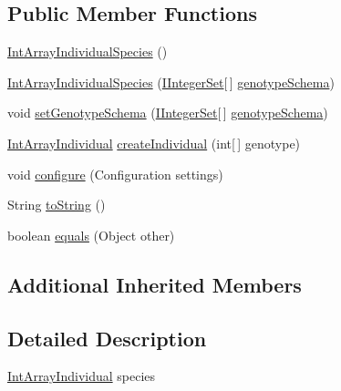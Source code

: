 \subsection*{Public Member Functions}
\begin{DoxyCompactItemize}
\item 
\hyperlink{classnet_1_1sf_1_1jclec_1_1intarray_1_1_int_array_individual_species_a1d4a3c33bf3f78b558bb1738b250b91a}{Int\-Array\-Individual\-Species} ()
\item 
\hyperlink{classnet_1_1sf_1_1jclec_1_1intarray_1_1_int_array_individual_species_a54f9d2290f50026820b68188daebc446}{Int\-Array\-Individual\-Species} (\hyperlink{interfacenet_1_1sf_1_1jclec_1_1util_1_1intset_1_1_i_integer_set}{I\-Integer\-Set}\mbox{[}$\,$\mbox{]} \hyperlink{classnet_1_1sf_1_1jclec_1_1intarray_1_1_int_array_species_a715c2117e4b1c70ab004accbf15848b7}{genotype\-Schema})
\item 
void \hyperlink{classnet_1_1sf_1_1jclec_1_1intarray_1_1_int_array_individual_species_a4bdfe95a34445e5a58c4296db3a1960b}{set\-Genotype\-Schema} (\hyperlink{interfacenet_1_1sf_1_1jclec_1_1util_1_1intset_1_1_i_integer_set}{I\-Integer\-Set}\mbox{[}$\,$\mbox{]} \hyperlink{classnet_1_1sf_1_1jclec_1_1intarray_1_1_int_array_species_a715c2117e4b1c70ab004accbf15848b7}{genotype\-Schema})
\item 
\hyperlink{classnet_1_1sf_1_1jclec_1_1intarray_1_1_int_array_individual}{Int\-Array\-Individual} \hyperlink{classnet_1_1sf_1_1jclec_1_1intarray_1_1_int_array_individual_species_ab60191ac3d3466aedecbfc2ec2ac604e}{create\-Individual} (int\mbox{[}$\,$\mbox{]} genotype)
\item 
void \hyperlink{classnet_1_1sf_1_1jclec_1_1intarray_1_1_int_array_individual_species_a9bcfbb7aba35202249e493f96a38bbf8}{configure} (Configuration settings)
\item 
String \hyperlink{classnet_1_1sf_1_1jclec_1_1intarray_1_1_int_array_individual_species_a9f7100f2f19c91ba40913edf48fd84df}{to\-String} ()
\item 
boolean \hyperlink{classnet_1_1sf_1_1jclec_1_1intarray_1_1_int_array_individual_species_ae1035290fc3233cbf6dae4018007e2b7}{equals} (Object other)
\end{DoxyCompactItemize}
\subsection*{Additional Inherited Members}


\subsection{Detailed Description}
\hyperlink{classnet_1_1sf_1_1jclec_1_1intarray_1_1_int_array_individual}{Int\-Array\-Individual} species

